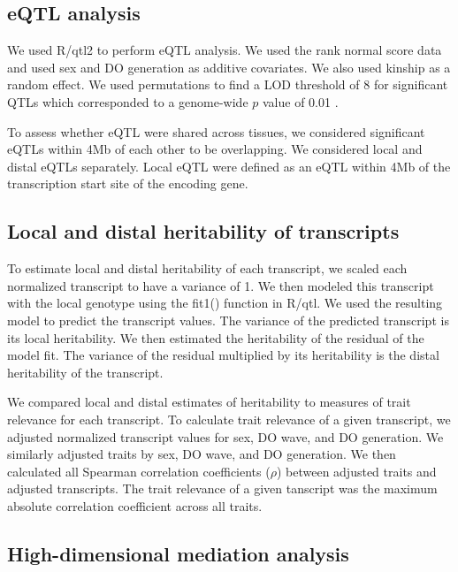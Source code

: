 \documentclass[
]{article}
\begin{document}
\subsection{eQTL analysis}\label{eqtl-analysis}

We used R/qtl2 \cite{pmid30591514} to perform eQTL analysis. We used the
rank normal score data and used sex and DO generation as additive
covariates. We also used kinship as a random effect. We used
permutations to find a LOD threshold of 8 for significant QTLs which
corresponded to a genome-wide \(p\) value of 0.01 \cite{pmid7851788}.

To assess whether eQTL were shared across tissues, we considered
significant eQTLs within 4Mb of each other to be overlapping. We
considered local and distal eQTLs separately. Local eQTL were defined as
an eQTL within 4Mb of the transcription start site of the encoding gene.

\subsection{Local and distal heritability of
transcripts}\label{local-and-distal-heritability-of-transcripts}

To estimate local and distal heritability of each transcript, we scaled
each normalized transcript to have a variance of 1. We then modeled this
transcript with the local genotype using the fit1() function in R/qtl.
We used the resulting model to predict the transcript values. The
variance of the predicted transcript is its local heritability. We then
estimated the heritability of the residual of the model fit. The
variance of the residual multiplied by its heritability is the distal
heritability of the transcript.

We compared local and distal estimates of heritability to measures of
trait relevance for each transcript. To calculate trait relevance of a
given transcript, we adjusted normalized transcript values for sex, DO
wave, and DO generation. We similarly adjusted traits by sex, DO wave,
and DO generation. We then calculated all Spearman correlation
coefficients (\(\rho\)) between adjusted traits and adjusted
transcripts. The trait relevance of a given tanscript was the maximum
absolute correlation coefficient across all traits.

\subsection{High-dimensional mediation
analysis}\label{high-dimensional-mediation-analysis}
\end{document}
